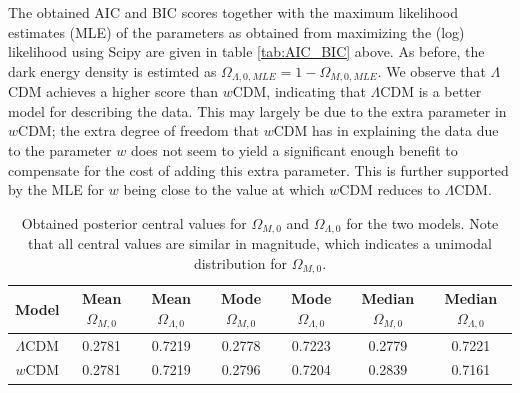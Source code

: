 \documentclass[11pt,a4paper]{article}
\begin{document}
The obtained AIC and BIC scores together with the maximum likelihood estimates (MLE) of the parameters as obtained from maximizing the (log) likelihood using Scipy are given in table \ref{tab:AIC_BIC} above. As before, the dark energy density is estimted as $\Omega_{\Lambda,0, MLE}=1-\Omega_{M,0, MLE}$. We observe that $\Lambda$CDM achieves a higher score than $w$CDM, indicating that $\Lambda$CDM is a better model for describing the data. This may largely be due to the extra parameter in $w$CDM; the extra degree of freedom that $w$CDM has in explaining the data due to the parameter $w$ does not seem to yield a significant enough benefit to compensate for the cost of adding this extra parameter. This is further supported by the MLE for $w$ being close to the value at which $w$CDM reduces to $\Lambda$CDM.




\begin{table}[h]
    \centering
    \caption{Obtained posterior central values for $\Omega_{M,0}$ and $\Omega_{\Lambda,0}$ for the two models. Note that all central values are similar in magnitude, which indicates a unimodal distribution for $\Omega_{M,0}$.}
    \begin{tabular}{||c | c c | c c | c c||} 
         \hline
         Model & Mean $\Omega_{M,0}$ & Mean $\Omega_{\Lambda,0}$ & Mode $\Omega_{M,0}$ & Mode $\Omega_{\Lambda,0}$ & Median $\Omega_{M,0}$ & Median $\Omega_{\Lambda,0}$ \\ [0.5ex] 
         \hline\hline
         $\Lambda$CDM & 0.2781 & 0.7219 & 0.2778 & 0.7223 & 0.2779 & 0.7221 \\
         \hline
         $w$CDM & 0.2781 & 0.7219 & 0.2796 & 0.7204 & 0.2839 & 0.7161 \\ [0.5ex] 
         \hline 
    \end{tabular}
    \label{tab:central_values}
\end{table}
\end{document}
